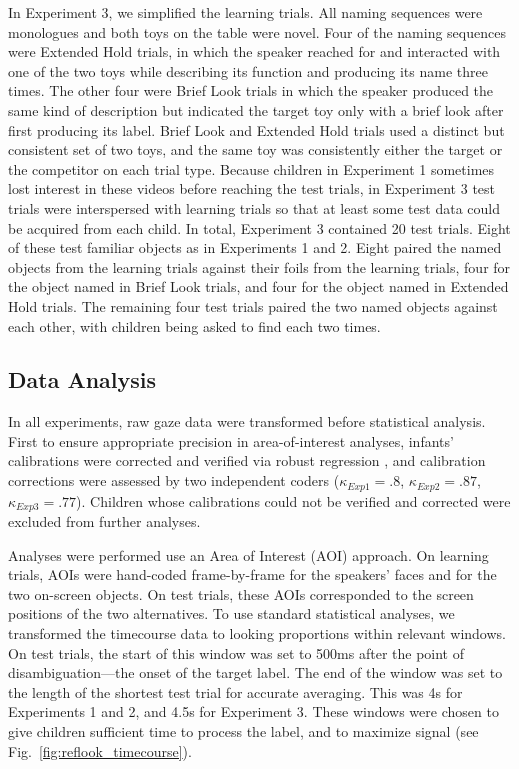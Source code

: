 \documentclass[jou,floatsintext]{apa6}
\begin{document}
In Experiment 3, we simplified the learning trials. All naming sequences were monologues and both toys on the table were novel.  Four of the naming sequences were Extended Hold trials, in which the speaker reached for and interacted with one of the two toys while describing its function and producing its name three times. The other four were Brief Look trials in which the speaker produced the same kind of description but indicated the target toy only with a brief look after first producing its label. Brief Look and Extended Hold trials used a distinct but consistent set of two toys, and the same toy was consistently either the target or the competitor on each trial type. Because children in Experiment 1 sometimes lost interest in these videos before reaching the test trials, in Experiment 3 test trials were interspersed with learning trials so that at least some test data could be acquired from each child. In total, Experiment 3 contained 20 test trials. Eight of these test familiar objects as in Experiments 1 and 2. Eight paired the named objects from the learning trials against their foils from the learning trials, four for the object named in Brief Look trials, and four for the object named in Extended Hold trials. The remaining four test trials paired the two named objects against each other, with children being asked to find each two times.

\setlength{\parskip}{1em}
\subsection{Data Analysis} In all experiments, raw gaze data were transformed before statistical analysis. First to ensure appropriate precision in area-of-interest analyses, infants' calibrations were corrected and verified via robust regression \cite<described in>{frank2012}, and calibration corrections were assessed by two independent coders ({\small$\kappa_{Exp1} = .8$}, {\small$\kappa_{Exp2} = .87$}, {\small$\kappa_{Exp3} = .77$}). Children whose calibrations could not be verified and corrected were excluded from further analyses.

\setlength{\parskip}{0em}

Analyses were performed use an Area of Interest (AOI) approach. On learning trials, AOIs were hand-coded frame-by-frame for the speakers' faces and for the two on-screen objects. On test trials, these AOIs corresponded to the screen positions of the two alternatives. To use standard statistical analyses, we transformed the timecourse data to looking proportions within relevant windows. On test trials, the start of this window was set to 500ms after the point of disambiguation---the onset of the target label. The end of the window was set to the length of the shortest test trial for accurate averaging. This was 4s for Experiments 1 and 2, and 4.5s for Experiment 3. These windows were chosen to give children sufficient time to process the label, and to maximize signal (see Fig.~\ref{fig:reflook_timecourse}).
\end{document}
